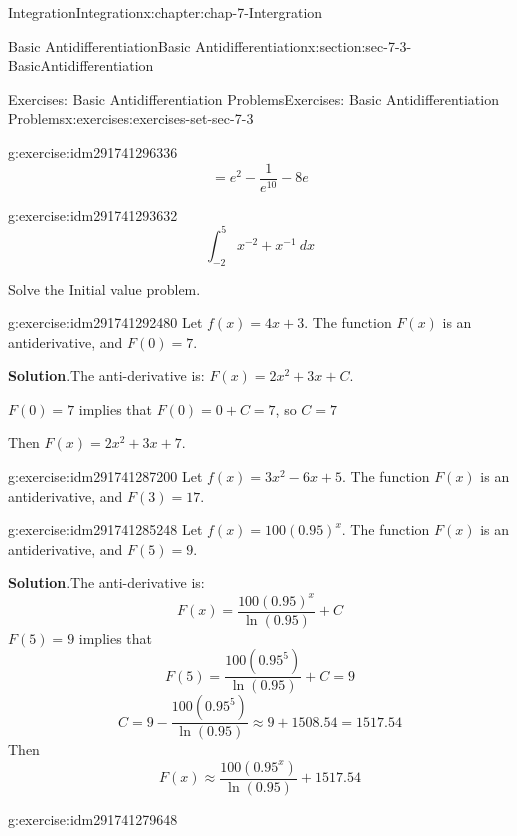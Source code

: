 \documentclass[oneside,10pt,]{book}
\numberwithin{equation}{section}
\begin{document}
\begin{chapterptx}{Integration}{}{Integration}{}{}{x:chapter:chap-7-Intergration}
\begin{sectionptx}{Basic Antidifferentiation}{}{Basic Antidifferentiation}{}{}{x:section:sec-7-3-BasicAntidifferentiation}
\begin{exercises-subsection}{Exercises: Basic Antidifferentiation Problems}{}{Exercises: Basic Antidifferentiation Problems}{}{}{x:exercises:exercises-set-sec-7-3}
\begin{divisionexercise}{11}{}{}{g:exercise:idm291741296336}
%
\begin{equation*}
= e^2-\frac{1}{e^{10}} -8 e
\end{equation*}
\end{divisionexercise}%
\begin{divisionexercise}{12}{}{}{g:exercise:idm291741293632}%
%
\begin{equation*}
\int_{-2}^5 x^{-2}+x^{-1} \  dx
\end{equation*}
\end{divisionexercise}%
Solve the Initial value problem.%
\begin{divisionexercise}{13}{}{}{g:exercise:idm291741292480}%
Let \(f(x)=4x+3\).  The function \(F(x)\) is an antiderivative, and \(F(0)=7\).%
\par\smallskip%
\noindent\textbf{Solution}.\hypertarget{g:solution:idm291741290672}{}\quad{}The anti-derivative is: \(F(x)=2x^2+3x+C\).%
\par
\(F(0)= 7\) implies that \(F(0)=0+C=7\), so \(C = 7\)%
\par
Then \(F(x)=2x^2+3x+7\).%
\end{divisionexercise}%
\begin{divisionexercise}{14}{}{}{g:exercise:idm291741287200}%
Let \(f(x)=3x^2-6x+5\).  The function \(F(x)\)  is an antiderivative, and \(F(3)=17\).%
\end{divisionexercise}%
\begin{divisionexercise}{15}{}{}{g:exercise:idm291741285248}%
Let \(f(x)=100(0.95)^x\).  The function \(F(x)\)  is an antiderivative, and \(F(5)=9\).%
\par\smallskip%
\noindent\textbf{Solution}.\hypertarget{g:solution:idm291741283424}{}\quad{}The anti-derivative is:%
%
\begin{equation*}
F(x)=\frac{100 (0.95)^x }{\ln(0.95)}   +C
\end{equation*}
\(F(5)= 9\) implies that%
%
\begin{equation*}
F(5)=\frac{100 (0.95^5 )}{\ln(0.95)} +C=9
\end{equation*}
%
\begin{equation*}
C=9-\frac{100 (0.95^5 )}{\ln(0.95)}\approx 9+1508.54=1517.54
\end{equation*}
Then%
%
\begin{equation*}
F(x)\approx\frac{100 (0.95^x )}{\ln(0.95)} +1517.54
\end{equation*}
\end{divisionexercise}%
\begin{divisionexercise}{16}{}{}{g:exercise:idm291741279648}%

\end{divisionexercise}
\end{exercises-subsection}
\end{sectionptx}
\end{chapterptx}
\end{document}
